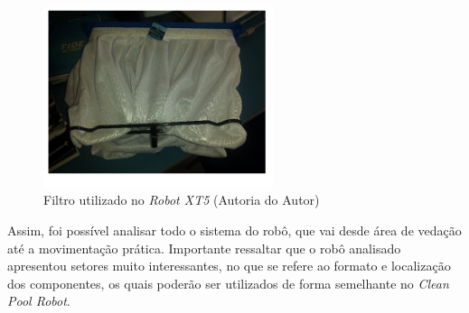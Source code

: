 \begin{figure}[!h]
   \centering
    \includegraphics[width=0.6\textwidth]{figures/robot_filter.jpg}
    \caption{Filtro utilizado no \textit{Robot XT5} (\textsf{Autoria do Autor})}
    \label{fig:robot_filter}
\end{figure}
\FloatBarrier

Assim, foi possível analisar todo o sistema do robô, que vai desde área de 
vedação até a movimentação prática. Importante ressaltar que o robô 
analisado apresentou setores muito interessantes, no que se refere ao formato 
e localização dos componentes, os quais poderão ser utilizados de forma 
semelhante no \textit{Clean Pool Robot}.

